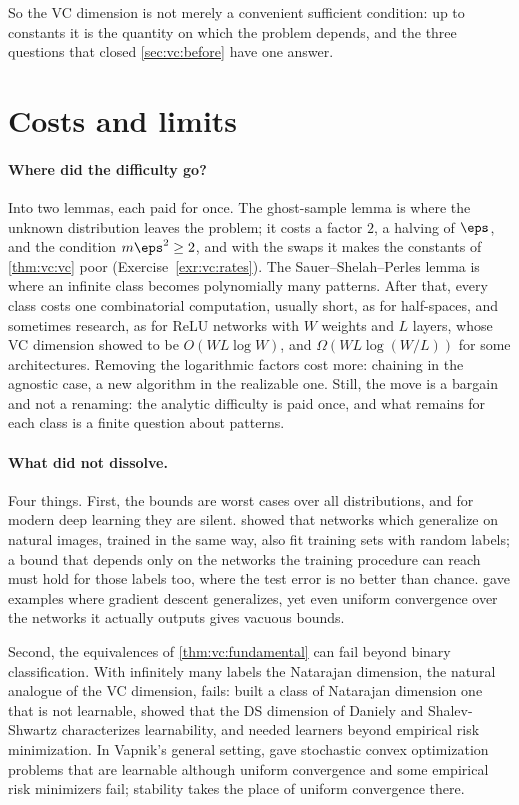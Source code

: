 \begin{refsection}
So the VC dimension is not merely a convenient sufficient condition: up to constants it is the quantity on which the problem depends, and the three questions that closed \cref{sec:vc:before} have one answer.

\section{Costs and limits}\label{sec:vc:costs}

\paragraph{Where did the difficulty go?} Into two lemmas, each paid for once. The ghost-sample lemma is where the unknown distribution leaves the problem; it costs a factor $2$, a halving of $\eps$, and the condition $m\eps^2\ge2$, and with the swaps it makes the constants of \cref{thm:vc:vc} poor (Exercise~\ref{exr:vc:rates}). The Sauer--Shelah--Perles lemma is where an infinite class becomes polynomially many patterns. After that, every class costs one combinatorial computation, usually short, as for half-spaces, and sometimes research, as for ReLU networks with $W$ weights and $L$ layers, whose VC dimension \textcite{BartlettEtAl2019} showed to be $O(WL\log W)$, and $\Omega(WL\log(W/L))$ for some architectures. Removing the logarithmic factors cost more: chaining in the agnostic case, a new algorithm in the realizable one. Still, the move is a bargain and not a renaming: the analytic difficulty is paid once, and what remains for each class is a finite question about patterns.

\paragraph{What did not dissolve.} Four things. First, the bounds are worst cases over all distributions, and for modern deep learning they are silent. \textcite{ZhangEtAl2017} showed that networks which generalize on natural images, trained in the same way, also fit training sets with random labels; a bound that depends only on the networks the training procedure can reach must hold for those labels too, where the test error is no better than chance. \textcite{NagarajanKolter2019} gave examples where gradient descent generalizes, yet even uniform convergence over the networks it actually outputs gives vacuous bounds.

Second, the equivalences of \cref{thm:vc:fundamental} can fail beyond binary classification. With infinitely many labels the Natarajan dimension, the natural analogue of the VC dimension, fails: \textcite{BrukhimEtAl2022} built a class of Natarajan dimension one that is not learnable, showed that the DS dimension of Daniely and Shalev-Shwartz characterizes learnability, and needed learners beyond empirical risk minimization. In Vapnik's general setting, \textcite{ShalevShwartzEtAl2010} gave stochastic convex optimization problems that are learnable although uniform convergence and some empirical risk minimizers fail; stability takes the place of uniform convergence there.


\end{refsection}

